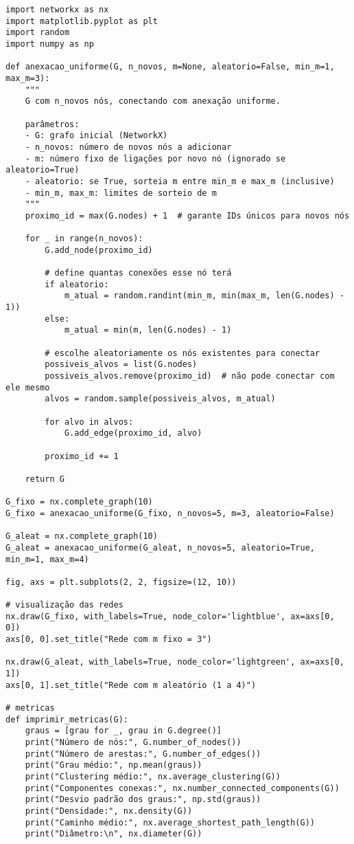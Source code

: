 \documentclass[a4paper]{article}
\begin{document}
\begin{verbatim}
import networkx as nx
import matplotlib.pyplot as plt
import random
import numpy as np

def anexacao_uniforme(G, n_novos, m=None, aleatorio=False, min_m=1, max_m=3):
    """
    G com n_novos nós, conectando com anexação uniforme.

    parâmetros:
    - G: grafo inicial (NetworkX)
    - n_novos: número de novos nós a adicionar
    - m: número fixo de ligações por novo nó (ignorado se aleatorio=True)
    - aleatorio: se True, sorteia m entre min_m e max_m (inclusive)
    - min_m, max_m: limites de sorteio de m
    """
    proximo_id = max(G.nodes) + 1  # garante IDs únicos para novos nós

    for _ in range(n_novos):
        G.add_node(proximo_id)

        # define quantas conexões esse nó terá
        if aleatorio:
            m_atual = random.randint(min_m, min(max_m, len(G.nodes) - 1))
        else:
            m_atual = min(m, len(G.nodes) - 1)

        # escolhe aleatoriamente os nós existentes para conectar
        possiveis_alvos = list(G.nodes)
        possiveis_alvos.remove(proximo_id)  # não pode conectar com ele mesmo
        alvos = random.sample(possiveis_alvos, m_atual)

        for alvo in alvos:
            G.add_edge(proximo_id, alvo)

        proximo_id += 1

    return G

G_fixo = nx.complete_graph(10)
G_fixo = anexacao_uniforme(G_fixo, n_novos=5, m=3, aleatorio=False)

G_aleat = nx.complete_graph(10)
G_aleat = anexacao_uniforme(G_aleat, n_novos=5, aleatorio=True, min_m=1, max_m=4)

fig, axs = plt.subplots(2, 2, figsize=(12, 10))

# visualização das redes
nx.draw(G_fixo, with_labels=True, node_color='lightblue', ax=axs[0, 0])
axs[0, 0].set_title("Rede com m fixo = 3")

nx.draw(G_aleat, with_labels=True, node_color='lightgreen', ax=axs[0, 1])
axs[0, 1].set_title("Rede com m aleatório (1 a 4)")

# metricas
def imprimir_metricas(G):
    graus = [grau for _, grau in G.degree()]
    print("Número de nós:", G.number_of_nodes())
    print("Número de arestas:", G.number_of_edges())
    print("Grau médio:", np.mean(graus))
    print("Clustering médio:", nx.average_clustering(G))
    print("Componentes conexas:", nx.number_connected_components(G))
    print("Desvio padrão dos graus:", np.std(graus))
    print("Densidade:", nx.density(G))
    print("Caminho médio:", nx.average_shortest_path_length(G))
    print("Diâmetro:\n", nx.diameter(G))



\end{verbatim}
\end{document}
